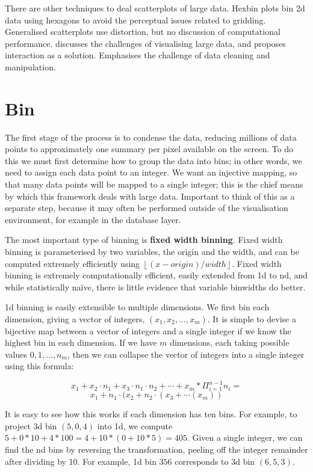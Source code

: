 \documentclass[journal]{vgtc}                %
\begin{document}
There are other techniques to deal scatterplots of large data. Hexbin plots \citep{carr:1987} bin 2d data using hexagons to avoid the perceptual issues related to gridding. Generalised scatterplots \citep{keim:2010} use distortion, but no discussion of computational performance. \citep{heer:2012} discusses the challenges of visualising large data, and proposes interaction as a solution. Emphasises the challenge of data cleaning and manipulation.

\section{Bin}
\label{sec:bin}

The first stage of the process is to condense the data, reducing millions of data points to approximately one summary per pixel available on the screen.  To do this we must first determine how to group the data into bins; in other words, we need to assign each data point to an integer. We want an injective mapping, so that many data points will be mapped to a single integer; this is the chief means by which this framework deals with large data. Important to think of this as a separate step, because it may often be performed outside of the visualisation environment, for example in the database layer. 

The most important type of binning is {\bf fixed width binning}. Fixed width binning is parameterised by two variables, the origin and the width, and can be computed extremely efficiently using $\left \lfloor (x - origin) / width \right \rfloor $. Fixed width binning is extremely computationally efficient, easily extended from 1d to nd, and while statistically na\"ive, there is little evidence that variable binwidths do better.

1d binning is easily extensible to multiple dimensions. We first bin each dimension, giving a vector of integers, $(x_1, x_2, ..., x_m)$. It is simple to devise a bijective map between a vector of integers and a single integer if we know the highest bin in each dimension. If we have $m$ dimensions, each taking possible values $0, 1, \ldots, n_m$, then we can collapse the vector of integers into a single integer using this formula:

\[ x_1 + x_2 \cdot n_1 + x_3 \cdot n_1 \cdot n_2 + \cdots + x_m * \Pi^{n-1}_{i = 1} n_i = \]
\[ x_1 + n_1 \cdot (x_2 + n_2 \cdot (x_3 + \cdots(x_m)) \]

It is easy to see how this works if each dimension has ten bins. For example, to project 3d bin $(5, 0, 4)$ into 1d, we compute $5 + 0 * 10 + 4 * 100 = 4 + 10 * (0 + 10 * 5) = 405$. Given a single integer, we can find the nd bins by reversing the transformation, peeling off the integer remainder after dividing by 10. For example, 1d bin $356$ corresponds to 3d bin $(6, 5, 3)$.
\end{document}
